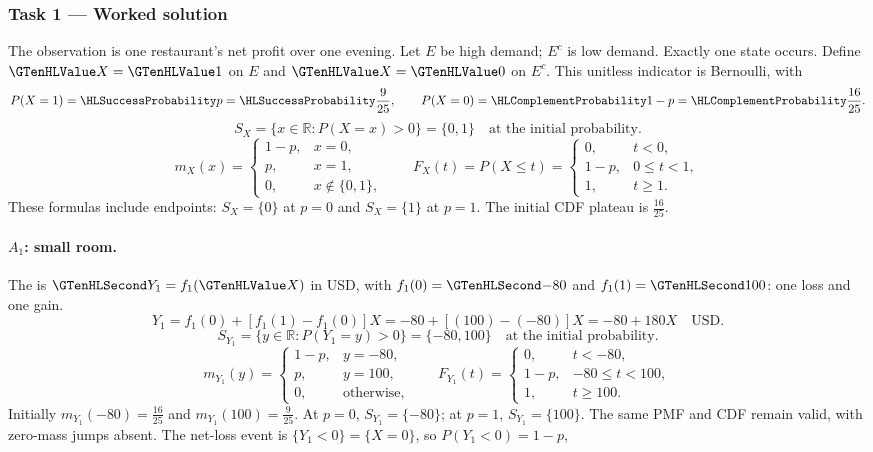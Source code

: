 \subsubsection*{Task 1 --- Worked solution}\label{sol:c3-restaurant-model}
The observation is one restaurant's net profit over one evening. Let $E$ be high demand; $E^c$ is low demand. Exactly one state occurs. Define $\Indicator{X}=\Indicator{1}$ on $E$ and $\Indicator{X}=\Indicator{0}$ on $E^c$. This unitless indicator is Bernoulli, with
\[P(X=1)=\SuccessProb{p}=\SuccessProb{\frac{9}{25}},\qquad P(X=0)=\FailureProb{1-p}=\FailureProb{\frac{16}{25}}.\]
\[S_X=\{x\in\mathbb R:P(X=x)>0\}=\{0,1\}\quad\text{at the initial probability}.\]
\[m_X(x)=\begin{cases}1-p,&x=0,\\p,&x=1,\\0,&x\notin\{0,1\},\end{cases}\qquad F_X(t)=P(X\leq t)=\begin{cases}0,&t<0,\\1-p,&0\leq t<1,\\1,&t\geq1.\end{cases}\]
These formulas include endpoints: $S_X=\{0\}$ at $p=0$ and $S_X=\{1\}$ at $p=1$. The initial CDF plateau is $\frac{16}{25}$.
\paragraph{$A_1$: small room.}
The  is $\Money{Y_1}=f_1(\Indicator{X})$ in USD,
with $f_1(0)=\Money{-80}$ and $f_1(1)=\Money{100}$: one loss and one gain.
\[
Y_1=f_1(0)+[f_1(1)-f_1(0)]X=-80+[(100)-(-80)]X=-80+180X\quad\text{USD}.
\]
\[S_{Y_1}=\{y\in\mathbb R:P(Y_1=y)>0\}=\{-80,100\}\quad\text{at the initial probability}.\]
\[
m_{Y_1}(y)=\begin{cases}1-p,&y=-80,\\p,&y=100,\\0,&\text{otherwise},\end{cases}
\qquad F_{Y_1}(t)=\begin{cases}0,&t<-80,\\1-p,&-80\leq t<100,\\1,&t\geq 100.\end{cases}
\]
Initially $m_{Y_1}(-80)=\frac{16}{25}$ and $m_{Y_1}(100)=\frac{9}{25}$.
At $p=0$, $S_{Y_1}=\{-80\}$; at $p=1$, $S_{Y_1}=\{100\}$.
The same PMF and CDF remain valid, with zero-mass jumps absent.
The net-loss event is $\{Y_1<0\}=\{X=0\}$, so $P(Y_1<0)=1-p$,
